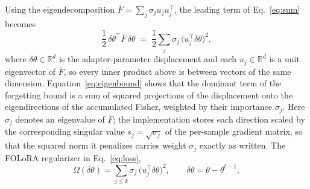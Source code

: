 Using the eigendecomposition $\bar{F}=\sum_j\sigma_j u_j u_j^{\!\top}$, the leading term
of Eq.~\eqref{eq:sum} becomes
\begin{equation}
\frac12\,\delta\theta^{\!\top}\bar{F}\,\delta\theta
\;=\;
\frac12\sum_{j}\sigma_j\,\big(u_j^{\!\top}\delta\theta\big)^2 ,
\label{eq:eigenbound}
\end{equation}
where $\delta\theta\in\mathbb{R}^{d}$ is the adapter-parameter displacement and each
$u_j\in\mathbb{R}^{d}$ is a unit eigenvector of $\bar{F}$, so every inner product above is
between vectors of the same dimension.
Equation~\eqref{eq:eigenbound} shows that the dominant term of the forgetting bound is a
sum of squared projections of the displacement onto the eigendirections of the
accumulated Fisher, weighted by their importance $\sigma_j$. Here $\sigma_j$ denotes an
eigenvalue of $\bar{F}$; the implementation stores each direction scaled by the
corresponding singular value $s_j=\sqrt{\sigma_j}$ of the per-sample gradient matrix, so
that the squared norm it penalizes carries weight $\sigma_j$ exactly as written. The
FOLoRA regularizer in
Eq.~\eqref{eq:loss},
\begin{equation}
\Omega(\delta\theta)=\sum_{j\le k}\sigma_j\,\big(u_j^{\!\top}\delta\theta\big)^2,
\qquad \delta\theta=\theta-\theta^{t-1},
\end{equation}
